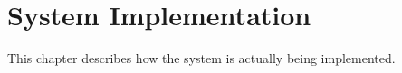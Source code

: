 \chapter{System Implementation}

This chapter describes how the system is actually being implemented.


